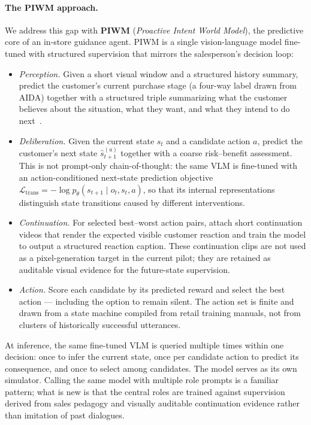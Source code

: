 \documentclass{article}
\begin{document}
\paragraph{The PIWM approach.}
We address this gap with \textbf{PIWM} (\emph{Proactive Intent World Model}), the predictive core of an in-store guidance agent. PIWM is a single vision-language model fine-tuned with structured supervision that mirrors the salesperson's decision loop:
\begin{itemize}
  \item \emph{Perception.} Given a short visual window and a structured history summary, predict the customer's current purchase stage (a four-way label drawn from AIDA) together with a structured triple summarizing what the customer believes about the situation, what they want, and what they intend to do next~\cite{Bratman}.
  \item \emph{Deliberation.} Given the current state $s_t$ and a candidate action $a$, predict the customer's next state $\hat{s}_{t+1}^{(a)}$ together with a coarse risk--benefit assessment. This is not prompt-only chain-of-thought: the same VLM is fine-tuned with an action-conditioned next-state prediction objective $\mathcal{L}_{\text{trans}} = -\log p_\theta(s_{t+1} \mid o_t, s_t, a)$, so that its internal representations distinguish state transitions caused by different interventions.
  \item \emph{Continuation.} For selected best--worst action pairs, attach short continuation videos that render the expected visible customer reaction and train the model to output a structured reaction caption. These continuation clips are not used as a pixel-generation target in the current pilot; they are retained as auditable visual evidence for the future-state supervision.
  \item \emph{Action.} Score each candidate by its predicted reward and select the best action --- including the option to remain silent. The action set is finite and drawn from a state machine compiled from retail training manuals, not from clusters of historically successful utterances.
\end{itemize}
At inference, the same fine-tuned VLM is queried multiple times within one decision: once to infer the current state, once per candidate action to predict its consequence, and once to select among candidates. The model serves as its own simulator. Calling the same model with multiple role prompts is a familiar pattern; what is new is that the central roles are trained against supervision derived from sales pedagogy and visually auditable continuation evidence rather than imitation of past dialogues.
\end{document}
